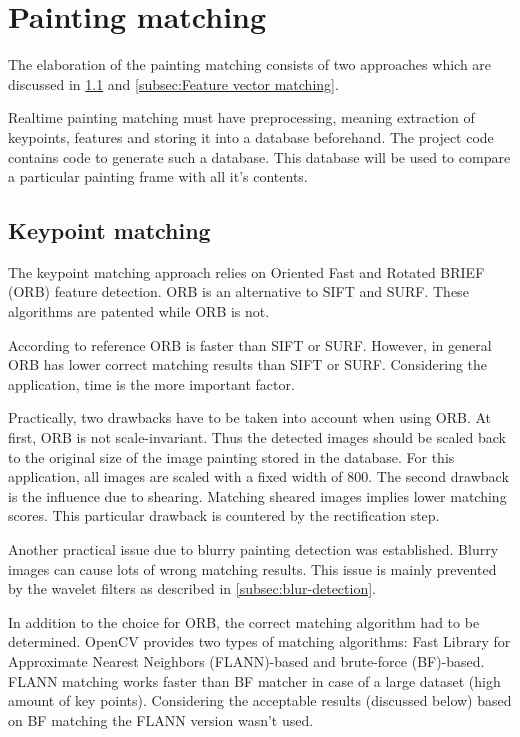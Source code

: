 \section{Painting matching}
\label{sec:painting-matching}

The elaboration of the painting matching consists of two approaches which are discussed in \ref{subsec:Keypoint matching} and \ref{subsec:Feature vector matching}. 

Realtime painting matching must have preprocessing, meaning extraction of keypoints, features and storing it into a database beforehand. The project code contains code to generate such a database. This database will be used to compare a particular painting frame with all it's contents.

\subsection{Keypoint matching}
\label{subsec:Keypoint matching}
The keypoint matching approach relies on Oriented Fast and Rotated BRIEF (ORB) feature detection. ORB is an alternative to SIFT and SURF. These algorithms are patented while ORB is not. \cite{opencvOrb}

According to reference \cite{orb_original_paper} ORB is faster than SIFT or SURF. However, in general ORB has lower correct matching results than SIFT or SURF. \cite{orb_surf_sift_evaluation} Considering the application, time is the more important factor.

Practically, two drawbacks have to be taken into account when using ORB. At first, ORB is not scale-invariant. Thus the detected images should be scaled back to the original size of the image painting stored in the database. For this application, all images are scaled with a fixed width of 800. The second drawback is the influence due to shearing. Matching sheared images implies lower matching scores. \cite{orb_surf_sift_evaluation} This particular drawback is countered by the rectification step.

Another practical issue due to blurry painting detection was established. Blurry images can cause lots of wrong matching results. This issue is mainly prevented by the wavelet filters as described in \ref{subsec:blur-detection}.

In addition to the choice for ORB, the correct matching algorithm had to be determined. OpenCV provides two types of matching algorithms: Fast Library for Approximate Nearest Neighbors (FLANN)-based and brute-force (BF)-based. FLANN matching works faster than BF matcher in case of a large dataset (high amount of key points). Considering the acceptable results (discussed below) based on BF matching the FLANN version wasn't used. \cite{opencv_matching}


